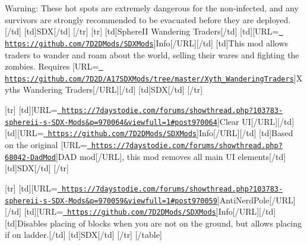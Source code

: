 Warning\+: These hot spots are extremely dangerous for the non-\/infected, and any survivors are strongly recommended to be evacuated before they are deployed.\mbox{[}/td\mbox{]} \mbox{[}td\mbox{]}S\+DX\mbox{[}/td\mbox{]} \mbox{[}/tr\mbox{]} \mbox{[}tr\mbox{]} \mbox{[}td\mbox{]}Sphere\+II Wandering Traders\mbox{[}/td\mbox{]} \mbox{[}td\mbox{]}\mbox{[}U\+RL=\href{https://github.com/7D2DMods/SDXMods}{\texttt{ https\+://github.\+com/7\+D2\+D\+Mods/\+S\+D\+X\+Mods}}\mbox{]}Info\mbox{[}/\+U\+RL\mbox{]}\mbox{[}/td\mbox{]} \mbox{[}td\mbox{]}This mod allows traders to wander and roam about the world, selling their wares and fighting the zombies. Requires \mbox{[}U\+RL=\href{https://github.com/7D2D/A17SDXMods/tree/master/Xyth_WanderingTraders}{\texttt{ https\+://github.\+com/7\+D2\+D/\+A17\+S\+D\+X\+Mods/tree/master/\+Xyth\+\_\+\+Wandering\+Traders}}\mbox{]}Xyth\textquotesingle{}s Wandering Traders\mbox{[}/\+U\+RL\mbox{]}\mbox{[}/td\mbox{]} \mbox{[}td\mbox{]}S\+DX\mbox{[}/td\mbox{]} \mbox{[}/tr\mbox{]}

\mbox{[}tr\mbox{]} \mbox{[}td\mbox{]}\mbox{[}U\+RL=\href{https://7daystodie.com/forums/showthread.php?103783-sphereii-s-SDX-Mods&p=970064&viewfull=1\#post970064}{\texttt{ https\+://7daystodie.\+com/forums/showthread.\+php?103783-\/sphereii-\/s-\/\+S\+D\+X-\/\+Mods\&p=970064\&viewfull=1\#post970064}}\mbox{]}Clear UI\mbox{[}/\+U\+RL\mbox{]}\mbox{[}/td\mbox{]} \mbox{[}td\mbox{]}\mbox{[}U\+RL=\href{https://github.com/7D2DMods/SDXMods}{\texttt{ https\+://github.\+com/7\+D2\+D\+Mods/\+S\+D\+X\+Mods}}\mbox{]}Info\mbox{[}/\+U\+RL\mbox{]}\mbox{[}/td\mbox{]} \mbox{[}td\mbox{]}Based on the original \mbox{[}U\+RL=\href{https://7daystodie.com/forums/showthread.php?68042-DadMod}{\texttt{ https\+://7daystodie.\+com/forums/showthread.\+php?68042-\/\+Dad\+Mod}}\mbox{]}D\+AD mod\mbox{[}/\+U\+RL\mbox{]}, this mod removes all main UI elements\mbox{[}/td\mbox{]} \mbox{[}td\mbox{]}S\+DX\mbox{[}/td\mbox{]} \mbox{[}/tr\mbox{]}

\mbox{[}tr\mbox{]} \mbox{[}td\mbox{]}\mbox{[}U\+RL=\href{https://7daystodie.com/forums/showthread.php?103783-sphereii-s-SDX-Mods&p=970059&viewfull=1\#post970059}{\texttt{ https\+://7daystodie.\+com/forums/showthread.\+php?103783-\/sphereii-\/s-\/\+S\+D\+X-\/\+Mods\&p=970059\&viewfull=1\#post970059}}\mbox{]}Anti\+Nerd\+Pole\mbox{[}/\+U\+RL\mbox{]}\mbox{[}/td\mbox{]} \mbox{[}td\mbox{]}\mbox{[}U\+RL=\href{https://github.com/7D2DMods/SDXMods}{\texttt{ https\+://github.\+com/7\+D2\+D\+Mods/\+S\+D\+X\+Mods}}\mbox{]}Info\mbox{[}/\+U\+RL\mbox{]}\mbox{[}/td\mbox{]} \mbox{[}td\mbox{]}Disables placing of blocks when you are not on the ground, but allows placing if on ladder.\mbox{[}/td\mbox{]} \mbox{[}td\mbox{]}S\+DX\mbox{[}/td\mbox{]} \mbox{[}/tr\mbox{]} \mbox{[}/table\mbox{]}

